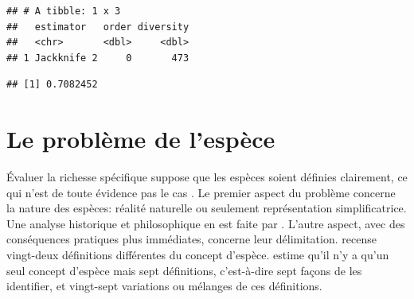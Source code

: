 \documentclass[
  11pt,
  american,
  a4paper,
  extrafontsizes,onecolumn,openright
  ]{memoir}
\newenvironment{Shaded}{\begin{snugshade}}{\end{snugshade}}
\newcommand{\CommentTok}[1]{\textcolor[rgb]{0.56,0.35,0.01}{\textit{#1}}}
\newcommand{\NormalTok}[1]{#1}
\newcommand{\SpecialCharTok}[1]{\textcolor[rgb]{0.81,0.36,0.00}{\textbf{#1}}}
\begin{document}
\begin{verbatim}
## # A tibble: 1 x 3
##   estimator   order diversity
##   <chr>       <dbl>     <dbl>
## 1 Jackknife 2     0       473
\end{verbatim}

\begin{Shaded}
\end{Shaded}

\begin{verbatim}
## [1] 0.7082452
\end{verbatim}

\normalsize

\section{Le problème de l'espèce}\label{le-probluxe8me-de-lespuxe8ce}

Évaluer la richesse spécifique suppose que les espèces soient définies clairement, ce qui n'est de toute évidence pas le cas \autocite{Casetta2014}.
Le premier aspect du problème concerne la nature des espèces: réalité naturelle ou seulement représentation simplificatrice.
Une analyse historique et philosophique en est faite par \textcite{Richards2010}.
L'autre aspect, avec des conséquences pratiques plus immédiates, concerne leur délimitation.
\textcite{Mayden1997} recense vingt-deux définitions différentes du concept d'espèce.
\textcite{Wilkins2011} estime qu'il n'y a qu'un seul concept d'espèce mais sept définitions, c'est-à-dire sept façons de les identifier, et vingt-sept variations ou mélanges de ces définitions.
\end{document}
